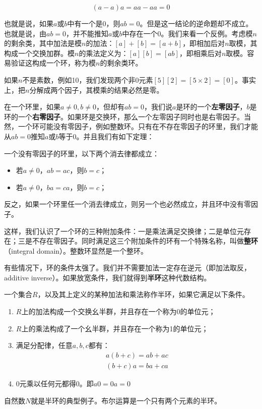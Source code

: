 \documentclass{article}
\begin{document}
\[
(a - a)a = aa - aa = 0
\]

也就是说，如果$a$或$b$中有一个是0，则$ab = 0$。但是这一结论的逆命题却不成立。也就是说，由$ab = 0$，并不能推知$a$或$b$中存在一个0。我们来看一个反例。考虑模$n$的剩余类，其中加法是模$n$的加法：$[a] + [b] = [a + b]$，即相加后对$n$取模，其构成一个交换加群。模$n$的乘法定义为：$[a][b] = [ab]$，即相乘后对$n$取模。容易验证这构成一个环，称为模$n$的剩余类环。

如果$n$不是素数，例如10，我们发现两个非0元素$[5][2] = [5 \times 2] = [0]$。事实上，把$n$分解成两个因子，其模乘的结果必然是零。

在一个环里，如果$a \neq 0, b \neq 0$，但却有$ab = 0$，我们说$a$是环的一个\textbf{左零因子}，$b$是环的一个\textbf{右零因子}。如果环是交换环，那么一个左零因子同时也是右零因子。当然，一个环可能没有零因子，例如整数环。只有在不存在零因子的环里，我们才能从$ab = 0$推知$a$或$b$等于0。并且我们有如下定理：

\begin{theorem}
一个没有零因子的环里，以下两个消去律都成立：
\begin{itemize}
\item 若$a \neq 0$，$ab = ac$，则$b = c$；
\item 若$a \neq 0$，$ba = ca$，则$b = c$；
\end{itemize}
\end{theorem}

反之，如果一个环里任一个消去律成立，则另一个也必然成立，并且环中没有零因子。

这样，我们认识了一个环的三种附加条件：一是乘法满足交换律；二是单位元存在；三是不存在零因子。同时满足这三个附加条件的环有一个特殊名称，叫做\textbf{整环}（integral domain）。整数环显然是一个整环。

有些情况下，环的条件太强了。我们并不需要加法一定存在逆元（即加法取反，additive inverse）。如果放宽条件，我们就得到\textbf{半环}这种代数结构。

\begin{definition}
一个集合$R$，以及其上定义的某种加法和乘法称作半环，如果它满足以下条件。
\begin{enumerate}
\item $R$上的加法构成一个交换幺半群，并且存在一个称为0的单位元；
\item $R$上的乘法构成了一个幺半群，并且存在一个称为1的单位元；
\item 满足分配律，任意$a, b, c$都有：
\[
\begin{array}{l}
a(b + c) = ab + ac \\
(b + c)a = ba + ca
\end{array}
\]
\item 0元乘以任何元都得0。即$a0 = 0a = 0$
\end{enumerate}
\end{definition}
自然数$N$就是半环的典型例子。布尔运算是一个只有两个元素的半环。
\end{document}
